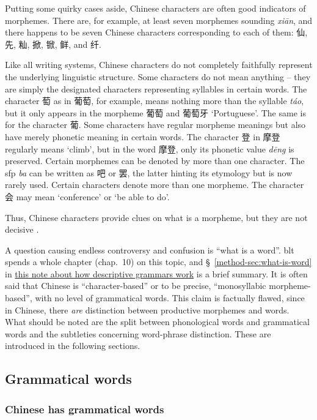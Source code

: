 \documentclass[UTF8, a4paper, oneside, scheme=plain]{ctexart}
\newcommand*{\citesec}[1]{\S~{#1}}
\newcommand*{\citechap}[1]{chap.~{#1}}
\newcommand*{\term}[1]{\emph{#1}}
\newcommand{\corpus}[1]{\emph{#1}}
\newcommand{\method}{\href{../methodology/glossing.pdf}{this note about how descriptive grammars work}}
\newcommand{\translate}[1]{`#1'}
\begin{document}
Putting some quirky cases aside,
Chinese characters are often good indicators of morphemes.
There are, for example, at least seven morphemes sounding \corpus{xi\={a}n},
and there happens to be seven Chinese characters corresponding to each of them:
仙, 先, 籼, 掀, 锨, 鲜, and 纤.

Like all writing systems, 
Chinese characters do not completely faithfully represent 
the underlying linguistic structure.
Some characters do not mean anything -- 
they are simply the designated characters representing syllables in certain words.
The character 萄 as in 葡萄, for example, 
means nothing more than the syllable \corpus{t\'{a}o},
but it only appears in the morpheme 葡萄 and 葡萄牙 \translate{Portuguese}.
The same is for the character 葡.
Some characters have regular morpheme meanings
but also have merely phonetic meaning in certain words.
The character 登 in 摩登 regularly means \translate{climb},
but in the word 摩登, only its phonetic value \corpus{d\={e}ng} is preserved.
Certain morphemes can be denoted by more than one character.
The \ac{sfp} \corpus{ba} can be written as 吧 or 罢,
the latter hinting its etymology but is now rarely used.
Certain characters denote more than one morpheme.
The character 会 may mean \translate{conference} or \translate{be able to do}. 

Thus, Chinese characters provide clues on what is a morpheme,
but they are not decisive \citep[1.1.4]{zhudexigrammar}.

A question causing endless controversy and confusion 
is ``what is a word''. 
\ac{blt} spends a whole chapter (\citechap{10}) on this topic,
and \citesec{\ref{method-sec:what-is-word}} in \method{}
is a brief summary. 
It is often said that Chinese is ``character-based''
or to be precise, ``monosyllabic morpheme-based'',
with no level of grammatical words.
This claim is factually flawed, 
since in Chinese, there \term{are} distinction between 
productive morphemes and words.
What should be noted are the split between phonological words and grammatical words %
and the subtleties concerning word-phrase distinction. %
These are introduced in the following sections.

\subsection{Grammatical words}\label{sec:grammatical-word}

\subsubsection{Chinese has grammatical words}
\end{document}
